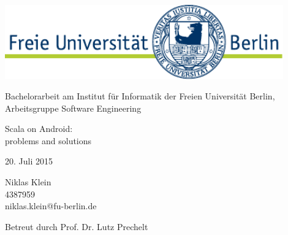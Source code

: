 \begin{titlepage}
\begin{center}

	\includegraphics[width=12cm]{asset/fu-logo.pdf}

	\vspace{1.5cm}

	Bachelorarbeit am Institut für Informatik der Freien Universität Berlin, Arbeitsgruppe Software Engineering

	\vspace{2.5cm}

	\begin{spacing}{1.3}
	\begin{huge}

		Scala on Android:\\
		problems and solutions

	\end{huge}
	\end{spacing}

	\vspace{1.2cm}

	20. Juli 2015

	\vspace{\fill}

	Niklas Klein\\
	4387959\\
	niklas.klein@fu-berlin.de

	\vspace{0.7cm}

	Betreut durch Prof. Dr. Lutz Prechelt

\end{center}
\end{titlepage}